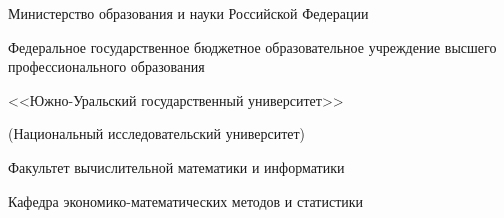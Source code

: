 \begin{center}

\begin{spacing}{0.9}
Министерство образования и науки Российской Федерации

{\small Федеральное государственное бюджетное образовательное учреждение высшего профессионального образования}

<<Южно-Уральский государственный университет>>

{\small (Национальный исследовательский университет)}

Факультет вычислительной математики и информатики

Кафедра экономико-математических методов и статистики
\end{spacing}

\end{center}